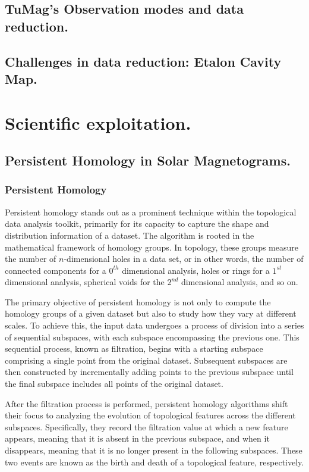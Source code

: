 \documentclass[12pt]{mythesis}
\begin{document}
\section{TuMag's Observation modes and data reduction.}
\section{Challenges in data reduction: Etalon Cavity Map.}

\chapter{Scientific exploitation.}




\section{Persistent Homology in Solar Magnetograms.}

\subsection{Persistent Homology}

Persistent homology stands out as a prominent technique within the topological data analysis toolkit, primarily for its capacity to capture the shape and distribution information of a dataset. The algorithm is rooted in the mathematical framework of homology groups. In topology, these groups measure the number of $n$-dimensional holes in a data set, or in other words, the number of connected components for a  $0^{th}$ dimensional analysis, holes or rings for a $1^{st}$ dimensional analysis, spherical voids for the $2^{nd}$ dimensional analysis, and so on. 

The primary objective of persistent homology is not only to compute the homology groups of a given dataset but also to study how they vary at different scales. To achieve this, the input data undergoes a process of division into a series of sequential subspaces, with each subspace encompassing the previous one. This sequential process, known as filtration, begins with a starting subspace comprising a single point from the original dataset. Subsequent subspaces are then constructed by incrementally adding points to the previous subspace until the final subspace includes all points of the original dataset. 

After the filtration process is performed, persistent homology algorithms shift their focus to analyzing the evolution of topological features across the different subspaces. Specifically, they record the filtration value at which a new feature appears, meaning that it is absent in the previous subspace, and when it disappears, meaning that it is no longer present in the following subspaces. These two events are known as the birth and death of a topological feature, respectively. 
\end{document}
